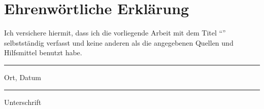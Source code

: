 \section*{Ehrenwörtliche Erklärung}
Ich versichere hiermit, dass ich die vorliegende Arbeit mit dem Titel \enquote{\Titel} selbstständig verfasst und keine anderen als die angegebenen Quellen und Hilfsmittel benutzt habe. \\[1.5cm]

\begin{minipage}{\textwidth}
    \begin{minipage}[t]{0.4\textwidth}
        \begin{center}
            \hrule
            \vspace{1.5mm}
            Ort, Datum
        \end{center}
    \end{minipage}
    \hfill
    \begin{minipage}[t]{0.4\textwidth}
        \begin{center}
            \hrule
            \vspace{1.5mm}
            Unterschrift
        \end{center}
    \end{minipage}
\end{minipage}